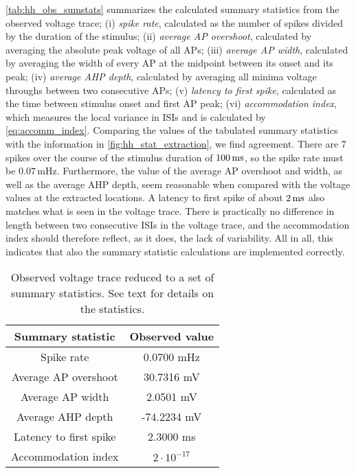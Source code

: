 \autoref{tab:hh_obs_sumstats} summarizes the calculated summary statistics from the observed voltage trace; (i) \textit{spike rate}, calculated as the number of spikes divided by the duration of the stimulus; (ii) \textit{average AP overshoot}, calculated by averaging the absolute peak voltage of all APs; (iii) \textit{average AP width}, calculated by averaging the width of every AP at the midpoint between its onset and its peak; (iv) \textit{average AHP depth}, calculated by averaging all minima voltage throughs between two consecutive APs; (v) \textit{latency to first spike}, calculated as the time between stimulus onset and first AP peak; (vi) \textit{accommodation index}, which measures the local variance in ISIs and is calculated by \cref{eq:accomm_index}. Comparing the values of the tabulated summary statistics with the information in \autoref{fig:hh_stat_extraction}, we find agreement. There are 7 spikes over the course of the stimulus duration of $100 \,\mathrm{ms}$, so the spike rate must be $0.07 \, \mathrm{mHz}$. Furthermore, the value of the average AP overshoot and width, as well as the average AHP depth, seem reasonable when compared with the voltage values at the extracted locations. A latency to first spike of about $2 \,\mathrm{ms}$ also matches what is seen in the voltage trace. There is practically no difference in length between two consecutive ISIs in the voltage trace, and the accommodation index should therefore reflect, as it does, the lack of variability. All in all, this indicates that also the summary statistic calculations are implemented correctly. 

\begin{table}[!htb]
  \caption{Observed voltage trace reduced to a set of summary statistics. See text for details on the statistics.  }
  \begin{center}
    \begin{tabular}{cc}
      \toprule
      \textbf{Summary statistic} & \textbf{Observed value} \\
      \midrule
      Spike rate &  0.0700 mHz \\
      Average AP overshoot & 30.7316 mV  \\
      Average AP width &  2.0501 mV \\
      Average AHP depth & -74.2234 mV \\
      Latency to first spike & 2.3000 ms \\
      Accommodation index &  $2 \cdot 10^{-17}$ \\
      \bottomrule
    \end{tabular}
  \end{center}
  \label{tab:hh_obs_sumstats}
\end{table}

